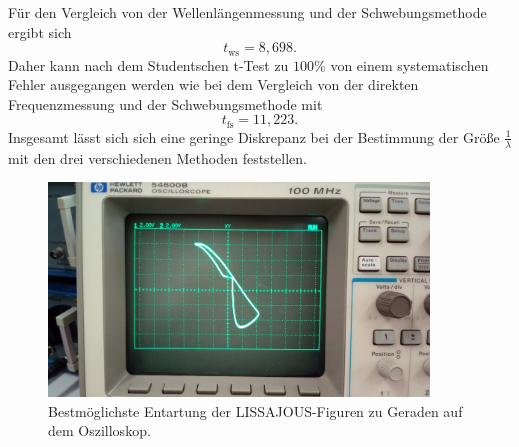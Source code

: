 Für den Vergleich von der Wellenlängenmessung und der Schwebungsmethode ergibt sich
\begin{equation*}
	t_{\mathrm{ws}} = 8,698 \mathrm{.}
\end{equation*}
Daher kann nach dem Studentschen t-Test zu $100\%$ von einem systematischen Fehler ausgegangen 
werden wie bei dem Vergleich von der direkten Frequenzmessung und der Schwebungsmethode
mit 
\begin{equation*}
	t_{\mathrm{fs}} = 11,223 \mathrm{.}
\end{equation*}
Insgesamt lässt sich sich eine geringe Diskrepanz bei der Bestimmung der Größe $\frac{1}{\lambda}$ mit den drei verschiedenen Methoden feststellen.
\begin{figure}
	\includegraphics[width=0.9\textwidth]{Bilder/lissajou.jpeg}
	\caption{Bestmöglichste Entartung der LISSAJOUS-Figuren zu Geraden auf dem Oszilloskop.}
	\label{fig:Lisas}
\end{figure}
